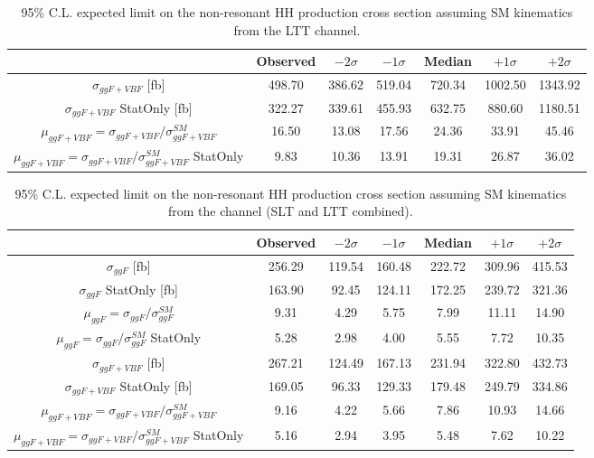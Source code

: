 \begin{table}
\centering
\begin{tabular}{|c|c|c|c|c|c|c|}
\hline
 & Observed & $-2\sigma$ & $-1\sigma$ & Median & $+1\sigma$ & $+2\sigma$\\
\hline
$\sigma_{ggF+VBF}$ [fb] & 498.70  &   386.62  &   519.04  &  720.34  &  1002.50  &  1343.92 \\ 
\hline
$\sigma_{ggF+VBF}$ StatOnly [fb] & 322.27  &   339.61  &   455.93  &  632.75  &   880.60  &  1180.51 \\ 
\hline
$\mu_{ggF+VBF}=\sigma_{ggF+VBF}/\sigma_{ggF+VBF}^{SM}$ & 16.50   &   13.08   &   17.56   &   24.36   &   33.91  &    45.46 \\ 
\hline
$\mu_{ggF+VBF}=\sigma_{ggF+VBF}/\sigma_{ggF+VBF}^{SM}$ StatOnly & 9.83   &   10.36  &    13.91   &   19.31   &   26.87  &    36.02 \\ 
\hline
\end{tabular}
\caption{95\% C.L. expected limit on the non-resonant HH production cross section assuming SM kinematics from the \lephad LTT channel.}
\label{sec:fit:tab:SMLepHadLTTLimits}
\end{table}

\begin{table}
\centering
\begin{tabular}{|c|c|c|c|c|c|c|}
\hline
 & Observed & $-2\sigma$ & $-1\sigma$ & Median & $+1\sigma$ & $+2\sigma$\\
\hline
$\sigma_{ggF}$ [fb] & 256.29  &   119.54  &   160.48  &  222.72  &   309.96  &   415.53 \\ 
\hline
$\sigma_{ggF}$ StatOnly [fb] & 163.90  &    92.45  &   124.11   &   172.25  &   239.72  &   321.36 \\ 
\hline
$\mu_{ggF}=\sigma_{ggF}/\sigma_{ggF}^{SM}$ & 9.31   &    4.29   &    5.75   &    7.99  &    11.11   &   14.90 \\ 
\hline
$\mu_{ggF}=\sigma_{ggF}/\sigma_{ggF}^{SM}$ StatOnly & 5.28   &    2.98   &    4.00   &    5.55   &    7.72    &  10.35 \\ 
\hline
\hline
$\sigma_{ggF+VBF}$ [fb] & 267.21  &   124.49  &   167.13  &  231.94  &   322.80  &   432.73 \\ 
\hline
$\sigma_{ggF+VBF}$ StatOnly [fb] & 169.05  &    96.33  &   129.33  &  179.48  &   249.79  &   334.86 \\ 
\hline
$\mu_{ggF+VBF}=\sigma_{ggF+VBF}/\sigma_{ggF+VBF}^{SM}$ & 9.16   &    4.22   &    5.66   &    7.86   &    10.93   &   14.66 \\ 
\hline
$\mu_{ggF+VBF}=\sigma_{ggF+VBF}/\sigma_{ggF+VBF}^{SM}$ StatOnly & 5.16   &    2.94   &    3.95   &    5.48   &    7.62  &    10.22 \\ 
\hline
\end{tabular}
\caption{95\% C.L. expected limit on the non-resonant HH production cross section assuming SM kinematics from the \lephad channel (SLT and LTT combined).}
\label{sec:fit:tab:SMLepHadLimits}
\end{table}

